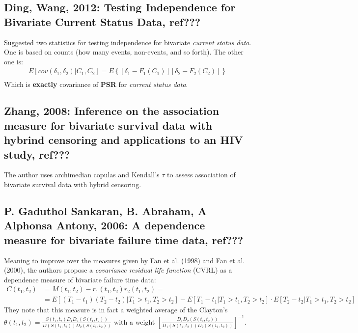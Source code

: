 \documentclass[]{article}
\begin{document}
\subsection{Ding, Wang, 2012: Testing Independence for Bivariate Current Status Data, ref???}
Suggested two statistics for testing independence for bivariate \emph{current status data}. One is based on counts (how many events, non-events, and so forth). The other one is:
	$$
	\begin{aligned}
		 E[cov(\delta_1, \delta_2)|C_1,C_2] = E\left\{ [\delta_1 - F_1(C_1)][\delta_2 - F_2(C_2)]  \right\}\\
	\end{aligned}
	$$
Which is \textbf{exactly} covariance of \textbf{PSR} for \emph{current status data}.

\subsection{Zhang, 2008: Inference on the association measure for bivariate survival data with hybrind censoring and applications to an HIV study, ref???}
The author uses archimedian copulas and Kendall's $\tau$ to assess association of bivariate survival data with hybrid censoring.

\subsection{P. Gaduthol Sankaran, B. Abraham, A Alphonsa Antony, 2006: A dependence measure for bivariate failure time data, ref???}
Meaning to improve over the measures given by Fan et al. (1998) and Fan et al. (2000), the authors propose a \emph{covariance residual life function} (CVRL) as a dependence measure of bivariate failure time data:
	$$
	\begin{aligned}
		 C(t_1, t_2) &= M(t_1, t_2) - r_1(t_1, t_2) r_2(t_1, t_2) =\\
		  &=E[(T_1-t_1)(T_2-t_2)|T_1>t_1,T_2>t_2] - E[T_1-t_1|T_1>t_1,T_2>t_2]\cdot E[T_2-t_2|T_1>t_1,T_2>t_2]
	\end{aligned}
	$$
They note that this measure is in fact a weighted average of the Clayton's $\theta(t_1,t_2) = \frac{S(t_1,t_2)D_1D_2(S(t_1,t_2))}{D(S(t_1,t_2))D_2(S(t_1,t_2))}$ with a weight $\left[ \frac{D_1D_2(S(t_1,t_2))}{D_1(S(t_1,t_2))D_2(S(t_1,t_2))} \right]^{-1}$.
\end{document}
